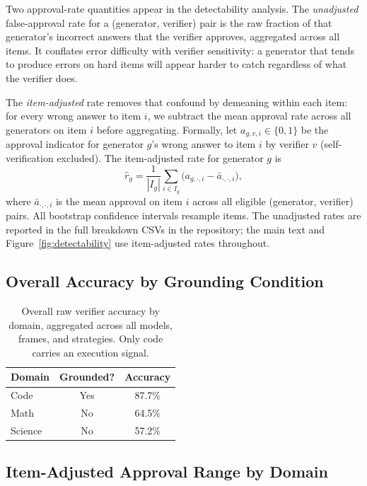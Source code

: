 \documentclass{article}
\begin{document}
Two approval-rate quantities appear in the detectability analysis.
The \emph{unadjusted} false-approval rate for a (generator, verifier) pair is
the raw fraction of that generator's incorrect answers that the verifier approves,
aggregated across all items. It conflates error difficulty with verifier
sensitivity: a generator that tends to produce errors on hard items will appear
harder to catch regardless of what the verifier does.

The \emph{item-adjusted} rate removes that confound by demeaning within each
item: for every wrong answer to item $i$, we subtract the mean approval rate
across all generators on item $i$ before aggregating. Formally, let
$a_{g,v,i} \in \{0,1\}$ be the approval indicator for generator $g$'s wrong
answer to item $i$ by verifier $v$ (self-verification excluded). The item-adjusted
rate for generator $g$ is
\[
  \hat{r}_g = \frac{1}{|I_g|} \sum_{i \in I_g}
    \bigl(a_{g,\cdot,i} - \bar{a}_{\cdot,\cdot,i}\bigr),
\]
where $\bar{a}_{\cdot,\cdot,i}$ is the mean approval on item $i$ across all
eligible (generator, verifier) pairs. All bootstrap confidence intervals
resample items. The unadjusted rates are reported in the full breakdown CSVs
in the repository; the main text and Figure~\ref{fig:detectability} use
item-adjusted rates throughout.

\subsection{Overall Accuracy by Grounding Condition}

\begin{table}[H]
\centering
\small
\caption{Overall raw verifier accuracy by domain, aggregated across all models,
frames, and strategies. Only code carries an execution signal.}
\label{tab:grounding-accuracy}
\begin{tabular}{lcc}
\toprule
Domain & Grounded? & Accuracy \\
\midrule
Code    & Yes & 87.7\% \\
Math    & No  & 64.5\% \\
Science & No  & 57.2\% \\
\bottomrule
\end{tabular}
\end{table}

\subsection{Item-Adjusted Approval Range by Domain}
\end{document}
